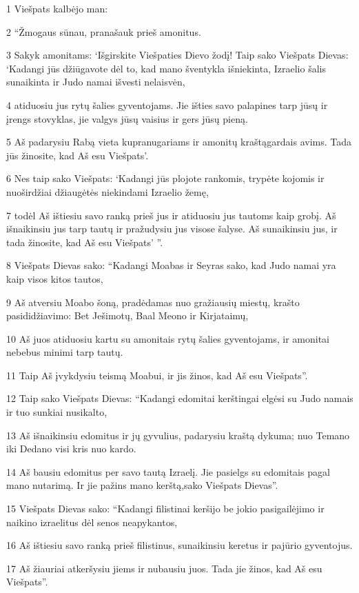 \par 1 Viešpats kalbėjo man: 
\par 2 “Žmogaus sūnau, pranašauk prieš amonitus. 
\par 3 Sakyk amonitams: ‘Išgirskite Viešpaties Dievo žodį! Taip sako Viešpats Dievas: ‘Kadangi jūs džiūgavote dėl to, kad mano šventykla išniekinta, Izraelio šalis sunaikinta ir Judo namai išvesti nelaisvėn, 
\par 4 atiduosiu jus rytų šalies gyventojams. Jie išties savo palapines tarp jūsų ir įrengs stovyklas, jie valgys jūsų vaisius ir gers jūsų pieną. 
\par 5 Aš padarysiu Rabą vieta kupranugariams ir amonitų kraštą­gardais avims. Tada jūs žinosite, kad Aš esu Viešpats’. 
\par 6 Nes taip sako Viešpats: ‘Kadangi jūs plojote rankomis, trypėte kojomis ir nuoširdžiai džiaugėtės niekindami Izraelio žemę, 
\par 7 todėl Aš ištiesiu savo ranką prieš jus ir atiduosiu jus tautoms kaip grobį. Aš išnaikinsiu jus tarp tautų ir pražudysiu jus visose šalyse. Aš sunaikinsiu jus, ir tada žinosite, kad Aš esu Viešpats’ ”. 
\par 8 Viešpats Dievas sako: “Kadangi Moabas ir Seyras sako, kad Judo namai yra kaip visos kitos tautos, 
\par 9 Aš atversiu Moabo šoną, pradėdamas nuo gražiausių miestų, krašto pasididžiavimo: Bet Ješimotų, Baal Meono ir Kirjataimų, 
\par 10 Aš juos atiduosiu kartu su amonitais rytų šalies gyventojams, ir amonitai nebebus minimi tarp tautų. 
\par 11 Taip Aš įvykdysiu teismą Moabui, ir jis žinos, kad Aš esu Viešpats”. 
\par 12 Taip sako Viešpats Dievas: “Kadangi edomitai kerštingai elgėsi su Judo namais ir tuo sunkiai nusikalto, 
\par 13 Aš išnaikinsiu edomitus ir jų gyvulius, padarysiu kraštą dykuma; nuo Temano iki Dedano visi kris nuo kardo. 
\par 14 Aš bausiu edomitus per savo tautą Izraelį. Jie pasielgs su edomitais pagal mano nutarimą. Ir jie pažins mano kerštą,­sako Viešpats Dievas”. 
\par 15 Viešpats Dievas sako: “Kadangi filistinai keršijo be jokio pasigailėjimo ir naikino izraelitus dėl senos neapykantos, 
\par 16 Aš ištiesiu savo ranką prieš filistinus, sunaikinsiu keretus ir pajūrio gyventojus. 
\par 17 Aš žiauriai atkeršysiu jiems ir nubausiu juos. Tada jie žinos, kad Aš esu Viešpats”.



